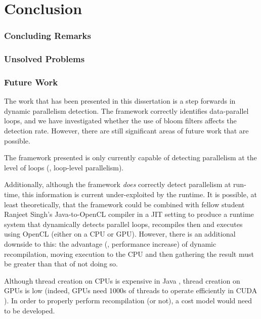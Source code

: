 \chapter{Conclusion} \label{chp:conclusion}
\subsection{Concluding Remarks} \label{sec:conclusion/remarks}

\subsection{Unsolved Problems} \label{sec:conclusion/unsolved}

\subsection{Future Work} \label{sec:conclusion/future-work}
The work that has been presented in this dissertation is a step forwards in dynamic parallelism detection. The framework correctly identifies data-parallel loops, and we have investigated whether the use of bloom filters affects the detection rate. However, there are still significant areas of future work that are possible.

The framework presented is only currently capable of detecting parallelism at the level of loops (\ie, loop-level parallelism). 

Additionally, although the framework \emph{does} correctly detect parallelism at run-time, this information is current under-exploited by the runtime. It is possible, at least theoretically, that the framework could be combined with fellow student Ranjeet Singh's Java-to-OpenCL compiler in a JIT setting to produce a runtime system that dynamically detects parallel loops, recompiles then and executes using OpenCL (either on a CPU or GPU). However, there is an additional downside to this: the advantage (\ie, performance increase) of dynamic recompilation, moving execution to the CPU and then gathering the result must be greater than that of not doing so.

Although thread creation on CPUs is expensive in Java \citep{JSR133}, thread creation on GPUs is low \citep{Mueller2009} (indeed, GPUs need 1000s of threads to operate efficiently in CUDA \citep{Nvidia2011}). In order to properly perform recompilation (or not), a cost model would need to be developed.